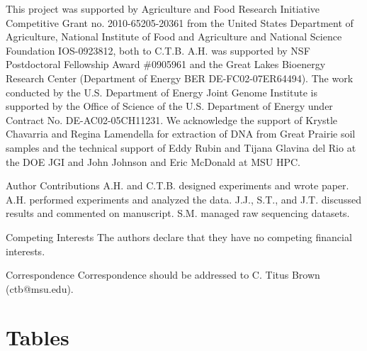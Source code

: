\documentclass{nature}%
\begin{document}
\begin{addendum}
\item This project was supported by Agriculture and Food Research Initiative
Competitive Grant no. 2010-65205-20361 from the United States
Department of Agriculture, National Institute of Food and Agriculture
and National Science Foundation IOS-0923812, both to C.T.B.  A.H. was
supported by NSF Postdoctoral Fellowship Award \#0905961 and the Great
Lakes Bioenergy Research Center (Department of Energy BER
DE-FC02-07ER64494).  The work conducted by the U.S. Department of
Energy Joint Genome Institute is supported by the Office of Science of
the U.S. Department of Energy under Contract No. DE-AC02-05CH11231.
We acknowledge the support of Krystle Chavarria and 
Regina Lamendella for extraction of DNA from Great Prairie soil samples
and the technical support of Eddy Rubin and Tijana Glavina del Rio 
at the DOE JGI and John Johnson and Eric McDonald at MSU HPC.  
\item[Author Contributions] A.H. and C.T.B. designed experiments and wrote
paper.
A.H. performed experiments and analyzed the data. J.J., S.T., and J.T. discussed
results
and commented on manuscript.  S.M. managed raw sequencing datasets.
\item[Competing Interests] The authors declare that they have no competing
financial
interests.
\item[Correspondence] Correspondence should be addressed to C. Titus Brown
(ctb@msu.edu).
\end{addendum}




\pagebreak


\section*{Tables}
\end{document}
